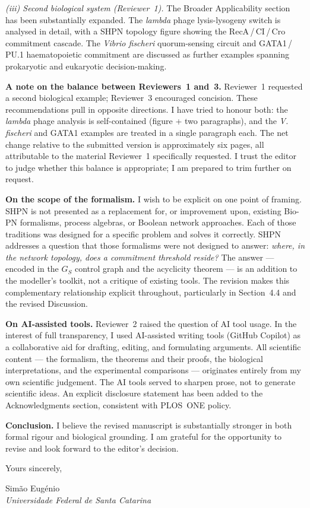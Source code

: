 \documentclass[11pt,letterpaper]{article}
\begin{document}
\textit{(iii) Second biological system (Reviewer~1).}
The Broader Applicability section has been substantially expanded. The
\textit{lambda} phage lysis-lysogeny switch is analysed in detail, with a
SHPN topology figure showing the RecA\,/\,CI\,/\,Cro commitment cascade. The
\textit{Vibrio fischeri} quorum-sensing circuit and GATA1\,/\,PU.1
haematopoietic commitment are discussed as further examples spanning
prokaryotic and eukaryotic decision-making.

\medskip
\textbf{A note on the balance between Reviewers~1 and~3.}
Reviewer~1 requested a second biological example; Reviewer~3 encouraged
concision. These recommendations pull in opposite directions. I have tried to
honour both: the \textit{lambda} phage analysis is self-contained (figure +
two paragraphs), and the \textit{V.\,fischeri} and GATA1 examples are treated
in a single paragraph each. The net change relative to the submitted version
is approximately six pages, all attributable to the material Reviewer~1
specifically requested. I trust the editor to judge whether this balance is
appropriate; I am prepared to trim further on request.

\medskip
\textbf{On the scope of the formalism.}
I wish to be explicit on one point of framing. SHPN is not presented as a
replacement for, or improvement upon, existing Bio-PN formalisms, process
algebras, or Boolean network approaches. Each of those traditions was designed
for a specific problem and solves it correctly. SHPN addresses a question that
those formalisms were not designed to answer: \textit{where, in the network
topology, does a commitment threshold reside?} The answer --- encoded in the
$G_S$ control graph and the acyclicity theorem --- is an addition to the
modeller's toolkit, not a critique of existing tools. The revision makes this
complementary relationship explicit throughout, particularly in Section~4.4
and the revised Discussion.

\medskip
\textbf{On AI-assisted tools.}
Reviewer~2 raised the question of AI tool usage. In the interest of full
transparency, I used AI-assisted writing tools (GitHub Copilot) as a
collaborative aid for drafting, editing, and formulating arguments. All
scientific content --- the formalism, the theorems and their proofs, the
biological interpretations, and the experimental comparisons --- originates
entirely from my own scientific judgement. The AI tools served to sharpen
prose, not to generate scientific ideas. An explicit disclosure statement has
been added to the Acknowledgments section, consistent with PLOS~ONE policy.

\medskip
\textbf{Conclusion.}
I believe the revised manuscript is substantially stronger in both formal
rigour and biological grounding. I am grateful for the opportunity to revise
and look forward to the editor's decision.

\bigskip

Yours sincerely,

\bigskip\bigskip

Sim\~{a}o Eug\'{e}nio\\
\textit{Universidade Federal de Santa Catarina}
\end{document}
